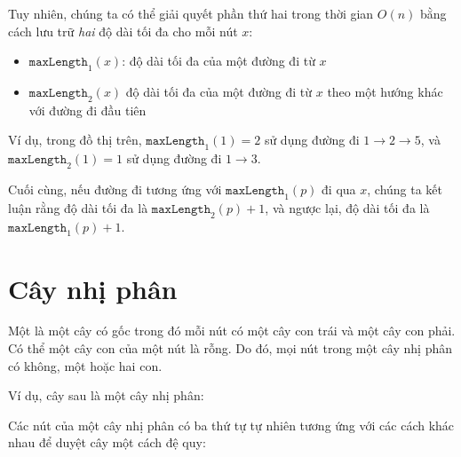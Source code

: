 Tuy nhiên, chúng ta có thể giải quyết phần thứ hai trong
thời gian $O(n)$ bằng cách lưu trữ \emph{hai} độ dài tối đa
cho mỗi nút $x$:
\begin{itemize}
\item $\texttt{maxLength}_1(x)$:
độ dài tối đa của một đường đi từ $x$
\item $\texttt{maxLength}_2(x)$
độ dài tối đa của một đường đi từ $x$
theo một hướng khác với đường đi đầu tiên
\end{itemize}
Ví dụ, trong đồ thị trên,
$\texttt{maxLength}_1(1)=2$
sử dụng đường đi $1 \rightarrow 2 \rightarrow 5$,
và $\texttt{maxLength}_2(1)=1$
sử dụng đường đi $1 \rightarrow 3$.

Cuối cùng, nếu đường đi tương ứng với
$\texttt{maxLength}_1(p)$ đi qua $x$,
chúng ta kết luận rằng độ dài tối đa là
$\texttt{maxLength}_2(p)+1$,
và ngược lại, độ dài tối đa là
$\texttt{maxLength}_1(p)+1$.


\section{Cây nhị phân}


\begin{samepage}
Một  là một cây có gốc
trong đó mỗi nút có một cây con trái và một cây con phải.
Có thể một cây con của một nút là rỗng.
Do đó, mọi nút trong một cây nhị phân có
không, một hoặc hai con.

Ví dụ, cây sau là một cây nhị phân:
\begin{center}
\end{center}
\end{samepage}


Các nút của một cây nhị phân có ba thứ tự
tự nhiên tương ứng với các cách khác nhau để
duyệt cây một cách đệ quy:

